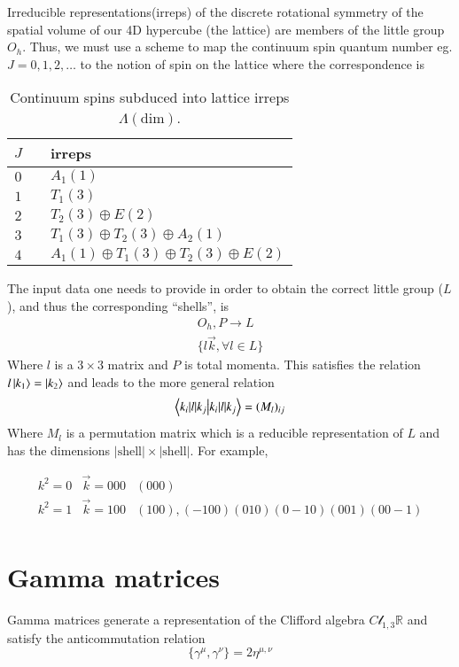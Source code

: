  Irreducible representations(irreps) of the discrete rotational symmetry of the spatial volume of our 4D hypercube (the lattice) are members of the little group $O_h$. Thus, we must use a scheme to map the continuum spin quantum number eg. $J=0,1,2,\dots$ to the notion of spin on the lattice where the correspondence is \cite{Dudek_2010}
\begin{table}
    \begin{tabular}{ccl}
    $J$ & & irreps \\
    \hline
    $0$ & & $A_1(1)$ \\
    $1$ & & $T_1(3)$ \\
    $2$ & & $T_2(3) \oplus E(2)$\\
    $3$ & & $T_1(3) \oplus T_2(3) \oplus A_2(1)$\\
    $4$ & & $A_1(1) \oplus T_1(3) \oplus T_2(3) \oplus E(2)$
\end{tabular}
\caption{Continuum spins subduced into lattice irreps $\Lambda(\mathrm{dim})$.}
\label{Table:Subduce}
\end{table}
    
The input data one needs to provide in order to obtain the correct little group ($L$), and thus the corresponding ``shells'', is 
\begin{align}
    O_h,P \rightarrow L \\
    \{l\vec{k}, \forall l \in L\}
\end{align}
Where $l$ is a $3\times3$ matrix and $P$ is total momenta. This satisfies the relation $l\ket{k_1} = \ket{k_2}$ and leads to the more general relation 
\begin{align}
    \braket{k_i|l|k_j} = (M_l)_{ij}
\end{align} 
Where $M_l$ is a permutation matrix which is a reducible representation of $L$ and has the dimensions $|\text{shell}| \times |\text{shell}|$. For example, 

\begin{align}
    k^2 = 0 & \vec{k} = 000 & {(000)} \\
    k^2 = 1 & \vec{k}=100 & {(100),(-100)(010)(0-10)(001)(00-1)} \\
\end{align}


\section{Gamma matrices}
Gamma matrices generate a representation of the Clifford algebra $C\mathcal{l}_{1,3}\mathbb{R}$ and satisfy the anticommutation relation 
\begin{equation}
    \{\gamma^\mu,\gamma^\nu \} = 2\eta^{\mu,\nu}
\end{equation}

